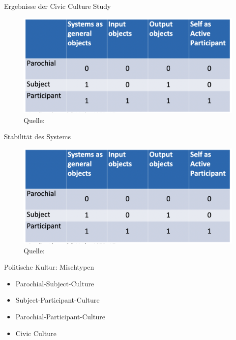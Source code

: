 \documentclass[11pt]{beamer}
\begin{document}
\begin{frame}[t]{Ergebnisse der Civic Culture Study}
	\begin{figure}[ht]
		\includegraphics[width=\textwidth]{pics/s3-4.png}
		\caption{Quelle: \cite[17]{Almond1963}}
	\end{figure}

\end{frame}

\begin{frame}[t]{Stabilität des Systems}
	\begin{figure}[ht]
		\includegraphics[width=\textwidth]{pics/s3-4.png}
		\caption{Quelle: \cite[22]{Almond1963}}
	\end{figure}

\end{frame}

\begin{frame}[t]{Politische Kultur: Mischtypen}
	\begin{itemize}
		\item Parochial-Subject-Culture
		\item Subject-Participant-Culture
		\item Parochial-Participant-Culture
		\item Civic Culture
	\end{itemize}

\end{frame}
\end{document}
